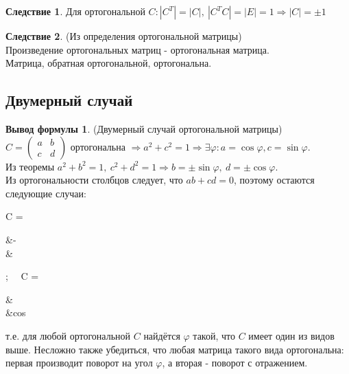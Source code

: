 \documentclass[a4paper, 12pt]{article}
\renewcommand{\phi}{\varphi}
\theoremstyle{definition}
\newtheorem*{consequense}{Следствие}
\newtheorem*{formula}{Вывод формулы}
\newenvironment{boxedalign*}
  {\begin{equation*}\begin{lrbox}{\boxedalignbox}$\begin{aligned}}
  {\end{aligned}$\end{lrbox}\fbox{\usebox{\boxedalignbox}}\end{equation*}}
\begin{document}
	\begin{consequense}
		Для ортогональной $C: |C^T| = |C|, \ |C^T C| = |E| = 1 \Rightarrow |C| = \pm 1$
	\end{consequense}
	\begin{consequense}(Из определения ортогональной матрицы)\\
		Произведение ортогональных матриц - ортогональная матрица.\\
		Матрица, обратная ортогональной, ортогональна.
	\end{consequense}
	\subsection{Двумерный случай}
	\begin{formula}(Двумерный случай ортогональной матрицы)\\
		$C = \begin{pmatrix} a&b\\c&d \end{pmatrix}$ ортогональна $\Rightarrow a^2 + c^2 = 1 \Rightarrow \exists \phi: a = \cos\phi, c = \sin\phi$.\\
		Из теоремы $a^2 + b^2 = 1, \ c^2 + d^2 = 1 \Rightarrow b = \pm\sin\phi, \ d = \pm\cos\phi$.\\
		Из ортогональности столбцов следует, что $ab + cd = 0$, поэтому остаются следующие случаи: \begin{boxedalign*}C = \begin{pmatrix} \cos\phi&-\sin\phi\\\sin\phi&\cos\phi\end{pmatrix}; \ \ C = \begin{pmatrix} \cos\phi&\sin\phi\\\sin\phi&\-cos\phi\end{pmatrix}\end{boxedalign*}
		т.е. для любой ортогональной $C$ найдётся $\phi$ такой, что $C$ имеет один из видов выше. Несложно также убедиться, что любая матрица такого вида ортогональна: первая производит поворот на угол $\phi$, а вторая - поворот с отражением.
	\end{formula}
\end{document}
